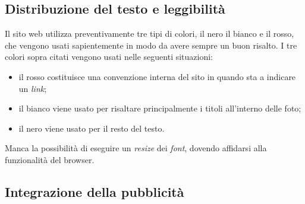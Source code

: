 \subsection{Distribuzione del testo e leggibilità}
Il sito web utilizza preventivamente tre tipi di colori, il nero il bianco e il
rosso, che vengono usati sapientemente in modo da avere sempre un buon risalto.
I tre colori sopra citati vengono usati nelle seguenti situazioni:
\begin{itemize}

  \item il rosso costituisce una convenzione interna del sito in
  quando sta a indicare un \textit{link};

  \item il bianco viene usato per risaltare principalmente i titoli
  all'interno delle foto;

  \item il nero viene usato per il resto del testo.

\end{itemize}
Manca la possibilità di eseguire un \textit{resize} dei \textit{font}, dovendo
affidarsi alla funzionalità del browser.

\subsection{Integrazione della pubblicità}


